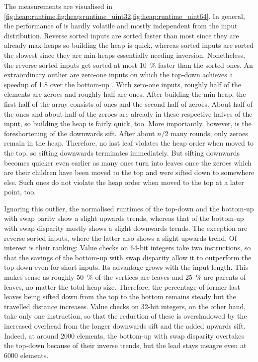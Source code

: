 The measurements are visualised in \cref{fig:heap:runtime,fig:heap:runtime_uint32,fig:heap:runtime_uint64}.
In general, the performance of \HS{} is hardly volatile and mostly independent from the input distribution.
Reverse sorted inputs are sorted faster than most since they are already max-heaps so building the heap is quick, whereas sorted inputs are sorted the slowest since they are min-heaps essentially needing inversion.
Nonetheless, the reverse sorted inputs get sorted at most \qty{10}{\percent} faster than the sorted ones.
An extraördinary outlier are zero-one inputs on which the top-down \HS{} achieves a speedup of \num{1.8} over the bottom-up \HS{}.
With zero-one inputs, roughly half of the elements are zeroes and roughly half are ones.
After building the min-heap, the first half of the array consists of ones and the second half of zeroes.
About half of the ones and about half of the zeroes are already in these respective halves of the input, so building the heap is fairly quick, too.
More importantly, however, is the foreshortening of the downwards sift.
After about \(n/2\) many rounds, only zeroes remain in the heap.
Therefore, no last leaf violates the heap order when moved to the top, so sifting downwards terminates immediately.
But sifting downwards becomes quicker even earlier as many ones turn into leaves once the zeroes which are their children have been moved to the top and were sifted down to somewhere else.
Such ones do not violate the heap order when moved to the top at a later point, too.


Ignoring this outlier, the normalised runtimes of the top-down \HS{} and the bottom-up \HS{} with swap parity show a slight upwards trends, whereas that of the bottom-up \HS{} with swap disparity mostly shows a slight downwards trends.
The exception are reverse sorted inputs, where the latter also shows a slight upwards trend.
Of interest is their ranking:
Value checks on 64-bit integers take two instructions, so that the savings of the bottom-up \HS{} with swap disparity allow it to outperform the top-down \HS{} even for short inputs.
Its advantage grows with the input length.
This makes sense as roughly \qty{50}{\percent} of the vertices are leaves and \qty{25}{\percent} are parents of leaves, no matter the total heap size.
Therefore, the percentage of former last leaves being sifted down from the top to the bottom remains steady but the travelled distance increases.
Value checks on 32-bit integers, on the other hand, take only one instruction, so that the reduction of these is overshadowed by the increased overhead from the longer downwards sift and the added upwards sift.
Indeed, at around 2000 elements, the bottom-up \HS{} with swap disparity overtakes the top-down \HS{} because of their inverse trends, but the lead stays meagre even at \num{6000} elements.


